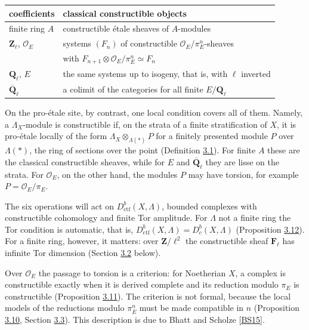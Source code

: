 \documentclass[11pt]{article}
\providecommand{\Dbc}{}\renewcommand{\Dbc}{D^b_c}
\begin{document}
\begin{center}\small
\begin{tabularx}{\linewidth}{>{\raggedright\arraybackslash}X>{\raggedright\arraybackslash}X}
\toprule
coefficients & classical constructible objects \\
\midrule
finite ring \(A\) & constructible étale sheaves of \(A\)-modules \\
\(\mathbf Z_\ell\), \(\mathcal O_E\) & systems \((F_n)\) of constructible   \(\mathcal O_E/\pi_E^n\)-sheaves \\
 & with \(F_{n+1}\otimes\mathcal O_E/\pi_E^n\simeq F_n\) \\
\(\mathbf Q_\ell\), \(E\) & the same systems up to isogeny, that is, with \(\ell\) inverted \\
\(\overline{\mathbf Q}_\ell\) & a colimit of the categories for all finite \(E/\mathbf Q_\ell\) \\
\bottomrule
\end{tabularx}
\end{center}

On the pro-étale site, by contrast, one local condition covers all of them. Namely, a \(\Lambda_X\)-module is constructible if, on the strata of a finite stratification of \(X\), it is pro-étale locally of the form \(\Lambda_X\otimes_{\Lambda(*)}P\) for a finitely presented module \(P\) over \(\Lambda(*)\), the ring of sections over the point (Definition \hyperref[bp199]{3.1}). For finite \(A\) these are the classical constructible sheaves, while for \(E\) and \(\overline{\mathbf Q}_\ell\) they are lisse on the strata. For \(\mathcal O_E\), on the other hand, the modules \(P\) may have torsion, for example \(P=\mathcal O_E/\pi_E\).

The six operations will act on \(D^b_{\mathrm{ctf}}(X,\Lambda)\), bounded complexes with constructible cohomology and finite Tor amplitude. For \(\Lambda\) not a finite ring the Tor condition is automatic, that is, \(D^b_{\mathrm{ctf}}(X,\Lambda)=\Dbc(X,\Lambda)\) (Proposition \hyperref[bp232]{3.12}). For a finite ring, however, it matters: over \(\mathbf Z/\ell^2\) the constructible sheaf \(\mathbf F_\ell\) has infinite Tor dimension (Section \hyperref[bp197]{3.2} below).

Over \(\mathcal O_E\) the passage to torsion is a criterion: for Noetherian \(X\), a complex is constructible exactly when it is derived complete and its reduction modulo \(\pi_E\) is constructible (Proposition \hyperref[bp226]{3.11}). The criterion is not formal, because the local models of the reductions modulo \(\pi_E^n\) must be made compatible in \(n\) (Proposition \hyperref[bp223]{3.10}, Section \hyperref[bp205]{3.3}). This description is due to Bhatt and Scholze [\hyperref[bp705]{BS15}].
\end{document}
